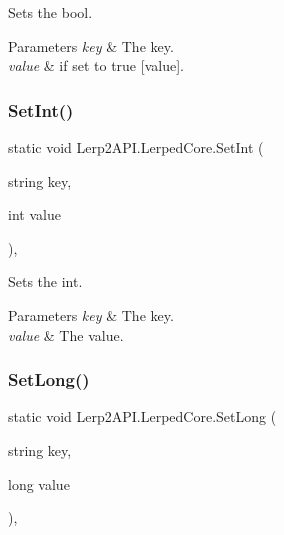 Sets the bool. 


\begin{DoxyParams}{Parameters}
{\em key} & The key.\\
\hline
{\em value} & if set to {\ttfamily true} \mbox{[}value\mbox{]}.\\
\hline
\end{DoxyParams}
\mbox{\label{class_lerp2_a_p_i_1_1_lerped_core_a604b706b940c895a0b6598cc98bdcc0f}} 
\subsubsection{\texorpdfstring{Set\+Int()}{SetInt()}}
{\footnotesize\ttfamily static void Lerp2\+A\+P\+I.\+Lerped\+Core.\+Set\+Int (\begin{DoxyParamCaption}\item[{string}]{key,  }\item[{int}]{value }\end{DoxyParamCaption})\hspace{0.3cm}{\ttfamily [inline]}, {\ttfamily [static]}}



Sets the int. 


\begin{DoxyParams}{Parameters}
{\em key} & The key.\\
\hline
{\em value} & The value.\\
\hline
\end{DoxyParams}
\mbox{\label{class_lerp2_a_p_i_1_1_lerped_core_a88491e9a5266926892183670b659c4f9}} 
\subsubsection{\texorpdfstring{Set\+Long()}{SetLong()}}
{\footnotesize\ttfamily static void Lerp2\+A\+P\+I.\+Lerped\+Core.\+Set\+Long (\begin{DoxyParamCaption}\item[{string}]{key,  }\item[{long}]{value }\end{DoxyParamCaption})\hspace{0.3cm}{\ttfamily [inline]}, {\ttfamily [static]}}



